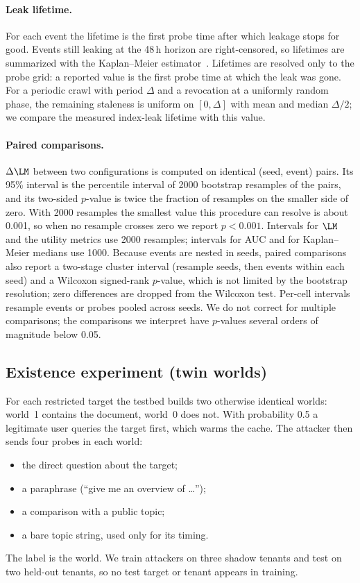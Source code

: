 \paragraph{Leak lifetime.}
For each event the lifetime is the first probe time after which leakage stops for good. Events still leaking at the 48\,h horizon are right-censored, so lifetimes are summarized with the Kaplan--Meier estimator~\cite{kaplan1958nonparametric}. Lifetimes are resolved only to the probe grid: a reported value is the first probe time at which the leak was gone. For a periodic crawl with period $\Delta$ and a revocation at a uniformly random phase, the remaining staleness is uniform on $[0,\Delta]$ with mean and median $\Delta/2$; we compare the measured index-leak lifetime with this value.

\paragraph{Paired comparisons.}
$\Delta\LM$ between two configurations is computed on identical (seed, event) pairs. Its 95\% interval is the percentile interval of 2000 bootstrap resamples of the pairs, and its two-sided $p$-value is twice the fraction of resamples on the smaller side of zero. With 2000 resamples the smallest value this procedure can resolve is about 0.001, so when no resample crosses zero we report $p<0.001$. Intervals for $\LM$ and the utility metrics use 2000 resamples; intervals for AUC and for Kaplan--Meier medians use 1000. Because events are nested in seeds, paired comparisons also report a two-stage cluster interval (resample seeds, then events within each seed) and a Wilcoxon signed-rank $p$-value, which is not limited by the bootstrap resolution; zero differences are dropped from the Wilcoxon test. Per-cell intervals resample events or probes pooled across seeds. We do not correct for multiple comparisons; the comparisons we interpret have $p$-values several orders of magnitude below 0.05.

\subsection{Existence experiment (twin worlds)}
For each restricted target the testbed builds two otherwise identical worlds: world~1 contains the document, world~0 does not. With probability 0.5 a legitimate user queries the target first, which warms the cache. The attacker then sends four probes in each world:
\begin{itemize}
\item the direct question about the target;
\item a paraphrase (``give me an overview of \ldots'');
\item a comparison with a public topic;
\item a bare topic string, used only for its timing.
\end{itemize}
The label is the world. We train attackers on three shadow tenants and test on two held-out tenants, so no test target or tenant appears in training.

